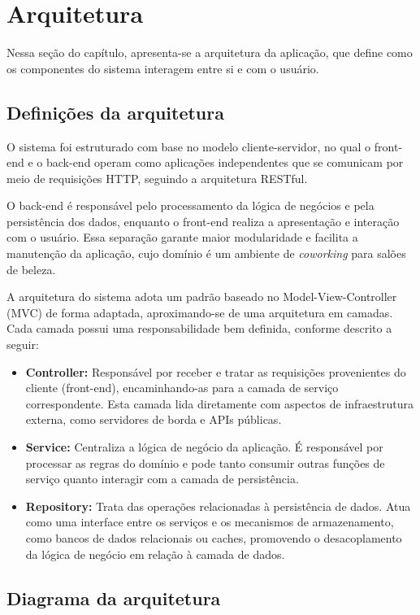 \section{Arquitetura}

Nessa seção do capítulo, apresenta-se a arquitetura da aplicação, que define como os componentes do sistema interagem entre si e com o usuário.

\subsection{Definições da arquitetura}

O sistema foi estruturado com base no modelo cliente-servidor, no qual o front-end e o back-end operam como aplicações independentes que se comunicam por meio de requisições HTTP, seguindo a arquitetura RESTful.

O back-end é responsável pelo processamento da lógica de negócios e pela persistência dos dados, enquanto o front-end realiza a apresentação e interação com o usuário. Essa separação garante maior modularidade e facilita a manutenção da aplicação, cujo domínio é um ambiente de \textit{coworking} para salões de beleza.

A arquitetura do sistema adota um padrão baseado no Model-View-Controller (MVC) de forma adaptada, aproximando-se de uma arquitetura em camadas. Cada camada possui uma responsabilidade bem definida, conforme descrito a seguir:

\begin{itemize}
  \item \textbf{Controller:} Responsável por receber e tratar as requisições provenientes do cliente (front-end), encaminhando-as para a camada de serviço correspondente. Esta camada lida diretamente com aspectos de infraestrutura externa, como servidores de borda e APIs públicas.
  \item \textbf{Service:} Centraliza a lógica de negócio da aplicação. É responsável por processar as regras do domínio e pode tanto consumir outras funções de serviço quanto interagir com a camada de persistência.
  \item \textbf{Repository:} Trata das operações relacionadas à persistência de dados. Atua como uma interface entre os serviços e os mecanismos de armazenamento, como bancos de dados relacionais ou caches, promovendo o desacoplamento da lógica de negócio em relação à camada de dados.
\end{itemize}

\subsection{Diagrama da arquitetura}

